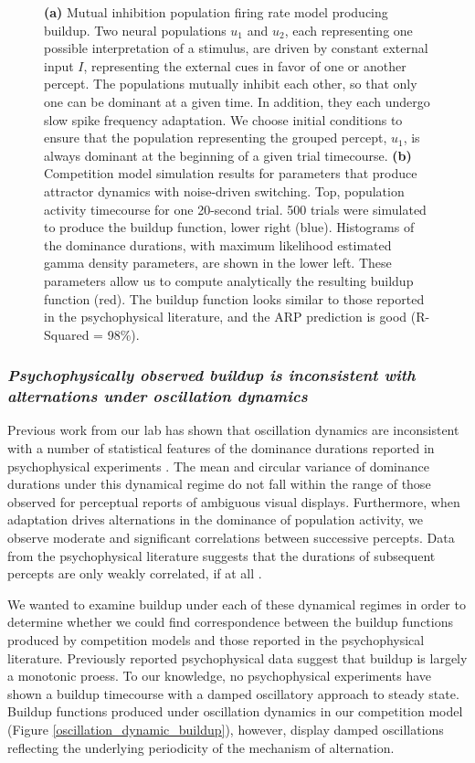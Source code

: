 \documentclass[10pt]{article}
\begin{document}
\begin{figure}
	
	\caption{\textbf{(a)} Mutual inhibition population firing rate model producing buildup. Two neural populations $u_1$ and $u_2$, each representing one possible interpretation of a stimulus, are driven by constant external input $I$, representing the external cues in favor of one or another percept. The populations mutually inhibit each other, so that only one can be dominant at a given time. In addition, they each undergo slow spike frequency adaptation. We choose initial conditions to ensure that the population representing the grouped percept, $u_1$, is always dominant at the beginning of a given trial timecourse. \textbf{(b)} Competition model simulation results for parameters that produce attractor dynamics with noise-driven switching. Top, population activity timecourse for one 20-second trial. 500 trials were simulated to produce the buildup function, lower right (blue). Histograms of the dominance durations, with maximum likelihood estimated gamma density parameters, are shown in the lower left. These parameters allow us to compute analytically the resulting buildup function (red).  The buildup function looks similar to those reported in the psychophysical literature, and the ARP prediction is good (R-Squared = 98\%).}
	\label{fig:making_comp_BUFs}
\end{figure}

\subsubsection*{\emph{Psychophysically observed buildup is inconsistent with alternations under oscillation dynamics}}

Previous work from our lab has shown that oscillation dynamics are inconsistent with a number of statistical features of the dominance durations reported in psychophysical experiments \cite{Shpiro2009}. The mean and circular variance of dominance durations under this dynamical regime do not fall within the range of those observed for perceptual reports of ambiguous visual displays. Furthermore, when adaptation drives alternations in the dominance of population activity, we observe moderate and significant correlations between successive percepts. Data from the psychophysical literature suggests that the durations of subsequent percepts are only weakly correlated, if at all \cite{Pressnitzer2006}.

We wanted to examine buildup under each of these dynamical regimes in order to determine whether we could find correspondence between the buildup functions produced by competition models and those reported in the psychophysical literature. Previously reported psychophysical data suggest that buildup is largely a monotonic proess. To our knowledge, no psychophysical experiments have shown a buildup timecourse with a damped oscillatory approach to steady state. Buildup functions produced under oscillation dynamics in our competition model (Figure \ref{oscillation_dynamic_buildup}), however, display damped oscillations reflecting the underlying periodicity of the mechanism of alternation. %
\end{document}
